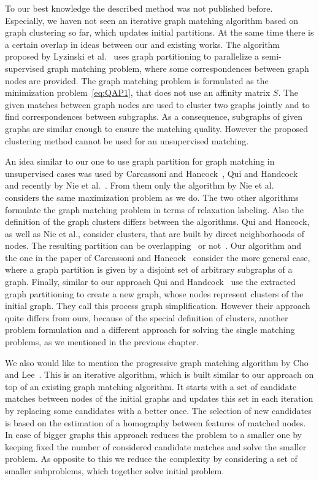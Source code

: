 To our best knowledge the described method was not published before. Especially, we haven not seen an iterative graph matching algorithm based on graph clustering so far, which updates initial partitions. At the same time there is a certain overlap in ideas between our and existing works. The algorithm proposed by Lyzinski et al.~\cite{Lyzinski2015} uses graph partitioning to parallelize a semi-supervised graph matching problem, where some correspondences between graph nodes are provided. The graph matching problem is formulated as the minimization problem~\eqref{eq:QAP1}, that does not use an affinity matrix $S$. The given matches between graph nodes are used to cluster two graphs jointly and to find correspondences between subgraphs. As a consequence, subgraphs of given graphs are similar enough to ensure the matching quality. However the proposed clustering method cannot be used for an unsupervised matching.

An idea similar to our one to use graph partition for graph matching in unsupervised cases was used by Carcassoni and Hancock~\cite{Hancock_ModalClusters}, Qui and Handcock~\cite{Hancock_GM_SpectralPart} and recently by Nie et al.~\cite{CliqueGraph_CVPR2015}. From them only the algorithm by Nie et al.~\cite{CliqueGraph_CVPR2015} considers the same maximization problem as we do. The two other algorithms formulate the graph matching problem in terms of relaxation labeling. Also the definition of the graph clusters differs between the algorithms. Qui and Hancock, as well as Nie et al., consider clusters, that are built by direct neighborhoods of nodes. The resulting partition can be overlapping~\cite{CliqueGraph_CVPR2015} or not~\cite{Hancock_GM_SpectralPart}. Our algorithm and the one in the paper of Carcassoni and Hancock~\cite{Hancock_ModalClusters} consider the more general case, where a graph partition is given by a disjoint set of arbitrary subgraphs of a graph.
Finally, similar to our approach Qui and Handcock~\cite{Hancock_GM_SpectralPart} use the extracted graph partitioning to create a new graph, whose nodes represent clusters of the initial graph. They call this process graph simplification. However their approach quite differs from ours, because of the special definition of clusters, another problem formulation and a different approach for solving the single matching problems, as we mentioned in the previous chapter.

We also would like to mention the progressive graph matching algorithm by Cho and Lee~\cite{Cho2012_ProgressiveGM}. This is an iterative algorithm, which is built similar to our approach on top of an existing graph matching algorithm. It starts with a set of candidate matches between nodes of the initial graphs and updates this set in each iteration by replacing some candidates with a better once. The selection of new candidates is based on the estimation of a homography between features of matched nodes. In case of bigger graphs this approach reduces the problem to a smaller one by keeping fixed the number of considered candidate matches and solve the smaller problem. As opposite to this we reduce the complexity by considering a set of smaller subproblems, which together solve initial problem.


